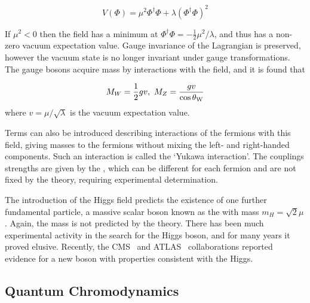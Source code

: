 \begin{equation}
V(\Phi) =  \mu^{2}\Phi^{\dagger}\Phi + \lambda(\Phi^{\dagger}\Phi)^{2}
\end{equation}

If $\mu^{2} < 0$ then the field has a minimum at $\Phi^{\dagger}\Phi = -
\frac{1}{2} \mu^{2}/\lambda$, and thus has a non-zero vacuum expectation value. 
Gauge invariance of the Lagrangian is preserved, however the vacuum state is no
longer invariant under gauge transformations.
The gauge bosons acquire mass by interactions with the field, and it is found
that

\begin{equation}
M_{W} = \frac{1}{2}gv, \ M_{Z} = \frac{gv}{\cos{\ensuremath{\theta_{\mathrm{W}}}}}
\end{equation}
where $v = \mu / \sqrt{\lambda}$ is the vacuum expectation value. 

Terms can also be
introduced describing interactions of the fermions with this field, giving
masses to the fermions without mixing the left- and right-handed components.
Such an interaction is called the `Yukawa interaction'. The couplings strengths
are given by the , which can be different for each
fermion and are not fixed by the theory, requiring experimental determination. 

The introduction of the Higgs field predicts the existence of one further
fundamental particle, a massive scalar boson known as the 
with mass $m_{H} = \sqrt{2}\mu$. Again, the mass is not predicted by the theory. 
There has
been much experimental activity in the search for the Higgs boson, and for many
years it proved elusive. Recently,
the CMS~\cite{CMS_Higgs:2012gu} and ATLAS~\cite{ATLAS_Higgs:2012gk} collaborations reported evidence for a new boson with
properties consistent with the Higgs.

\subsection{Quantum Chromodynamics}

